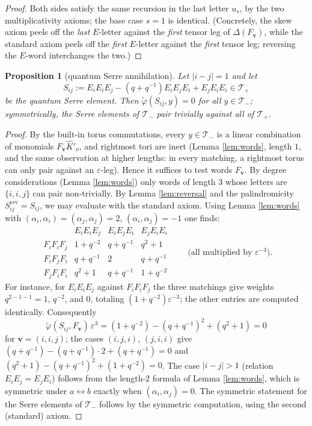 \documentclass[11pt]{amsart}
\newtheorem{proposition}[theorem]{Proposition}
\theoremstyle{definition}
\newcommand{\hK}{\hat K}
\newcommand{\al}{\alpha}
\begin{document}
\begin{proof}
Both sides satisfy the same recursion in the last letter $u_s$, by the two
multiplicativity axioms; the base case $s=1$ is identical. (Concretely, the skew
axiom peels off the \emph{last} $E$-letter against the \emph{first} tensor leg
of $\Delta(F_{\mathbf v})$, while the standard axiom peels off the \emph{first}
$E$-letter against the \emph{first} tensor leg; reversing the $E$-word
interchanges the two.)
\end{proof}

\begin{proposition}[quantum Serre annihilation]\label{prop:Serre}
Let $|i-j|=1$ and let
\[
S_{ij}:=E_iE_iE_j-(q+q^{-1})E_iE_jE_i+E_jE_iE_i\in\mathcal T_+
\]
be the quantum Serre element. Then
$\widetilde\varphi(S_{ij},y)=0$ for all $y\in\mathcal T_-$; symmetrically, the
Serre elements of $\mathcal T_-$ pair trivially against all of $\mathcal T_+$.
\end{proposition}

\begin{proof}
By the built-in torus commutations, every $y\in\mathcal T_-$ is a linear
combination of monomials $F_{\mathbf v}\hK'_\nu$, and rightmost tori are inert
(Lemma \ref{lem:words}, length $1$, and the same observation at higher lengths:
in every matching, a rightmost torus can only pair against an
$\varepsilon$-leg). Hence it suffices to test words $F_{\mathbf v}$. By degree
considerations (Lemma \ref{lem:words}) only words of length $3$ whose letters
are $\{i,i,j\}$ can pair non-trivially. By Lemma \ref{lem:reversal} and the
palindromicity $S_{ij}^{\mathrm{rev}}=S_{ij}$, we may evaluate with the standard
axiom. Using Lemma \ref{lem:words} with $(\al_i,\al_i)=(\al_j,\al_j)=2$,
$(\al_i,\al_j)=-1$ one finds:
\[
\begin{array}{c|ccc}
 & E_iE_iE_j & E_iE_jE_i & E_jE_iE_i\\ \hline
F_iF_iF_j & 1+q^{-2} & q+q^{-1} & q^2+1\\
F_iF_jF_i & q+q^{-1} & 2 & q+q^{-1}\\
F_jF_iF_i & q^2+1 & q+q^{-1} & 1+q^{-2}
\end{array}
\qquad\text{(all multiplied by }\varepsilon^{-3}\text{)}.
\]
For instance, for $E_iE_iE_j$ against $F_iF_iF_j$ the three matchings give
weights $q^{2-1-1}=1$, $q^{-2}$, and $0$, totaling $(1+q^{-2})\varepsilon^{-3}$;
the other entries are computed identically. Consequently
\[
\widetilde\varphi(S_{ij},F_{\mathbf v})\,\varepsilon^{3}
=(1+q^{-2})-(q+q^{-1})^2+(q^2+1)=0
\]
for $\mathbf v=(i,i,j)$; the cases $(i,j,i)$, $(j,i,i)$ give
$(q+q^{-1})-(q+q^{-1})\cdot2+(q+q^{-1})=0$ and
$(q^2+1)-(q+q^{-1})^2+(1+q^{-2})=0$. The case $|i-j|>1$ (relation
$E_iE_j=E_jE_i$) follows from the length-$2$ formula of Lemma \ref{lem:words},
which is symmetric under $a\leftrightarrow b$ exactly when
$(\al_i,\al_j)=0$. The symmetric statement for the Serre elements of
$\mathcal T_-$ follows by the symmetric computation, using the second (standard)
axiom.
\end{proof}
\end{document}
